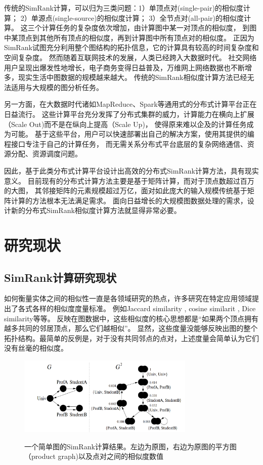 \documentclass[master]{njuthesis}
\begin{document}
传统的SimRank计算，可以归为三类问题：1）单顶点对(single-pair)的相似度计算；
2）单源点(single-source)的相似度计算； 3）全节点对(all-pair)的相似度计算。
这三个计算任务的复杂度依次增加，由计算图中某一对顶点的相似度，
到图中某顶点到其他所有顶点的相似度，再到计算图中所有顶点对的相似度。
正因为SimRank试图充分利用整个图结构的拓扑信息，它的计算具有较高的时间复杂度和空间复杂度。
然而随着互联网技术的发展，人类已经跨入大数据时代。
社交网络用户呈现出爆发性地增长，电子商务变得日益普及，万维网上网络数据也不断增多，现实生活中图数据的规模越来越大。
传统的SimRank相似度计算方法已经无法适用与大规模的图分析任务。


另一方面，在大数据时代诸如MapReduce\cite{DBLP:conf/osdi/DeanG04}、Spark\cite{DBLP:conf/hotcloud/ZahariaCFSS10}等通用式的分布式计算平台正在日益流行。
这些计算平台充分发挥了分布式集群的威力，计算能力在横向上扩展（Scale Out)而不是在纵向上提高（Scale Up)，
使得原来难以企及的计算任务成为可能。
基于这些平台，用户可以快速部署出自己的解决方案，使用其提供的编程接口专注于自己的计算任务，
而无需关系分布式平台底层的复杂网络通信、资源分配、资源调度问题。

因此，基于此类分布式计算平台设计出高效的分布式SimRank计算方法，具有现实意义。
目前现有的分布式计算方法主要是基于矩阵计算，而对于顶点数超过百万的大图，
其邻接矩阵的元素规模超过万亿，面对如此庞大的输入规模传统基于矩阵计算的方法根本无法满足需求。
面向日益增长的大规模图数据处理的需求，设计新的分布式SimRank相似度计算方法就显得非常必要。


\section{研究现状}
\subsection{SimRank计算研究现状}
如何衡量实体之间的相似性一直是各领域研究的热点，许多研究在特定应用领域提出了各式各样的相似度度量标准。
例如Jaccard similarity \cite{jaccard1901etude}, cosine similarit \cite{baeza1999modern}, Dice similarity\cite{dice1945measures}等等。
反映在图数据中，这些相似度的核心思想都是“如果两个顶点拥有越多共同的邻居顶点，那么它们越相似”。
显然，这些度量没能够反映出图的整个拓扑结构。最简单的反例是，对于没有共同邻点的点对，上述度量会简单认为它们没有丝毫的相似度。
\begin{figure}[h]
  \centering
  \includegraphics[width= 0.75\textwidth]{figure/simrank.png}\\
  \caption{一个简单图的SimRank计算结果。左边为原图，右边为原图的平方图（product graph)以及点对之间的相似度数值}
  \label{fig:simrank_example}
\end{figure}
\end{document}
